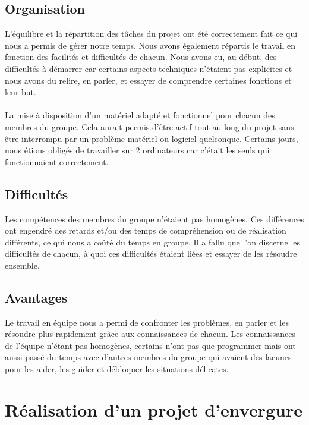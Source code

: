 \documentclass[12pt]{article}
\begin{document}
\subsection{Organisation}

	L'équilibre et la répartition des tâches du projet ont été correctement fait ce qui nous a permis de gérer notre temps. Nous avons également répartis le travail en fonction des facilités et difficultés de chacun. Nous avons eu, au début, des difficultés à démarrer car certains aspects techniques n'étaient pas explicites et nous avons du relire, en parler, et essayer de comprendre certaines fonctions et leur but.\\\\
	La mise à disposition d'un matériel adapté et fonctionnel pour chacun des membres du groupe. Cela aurait permis d'être actif tout au long du projet sans être interrompu par un problème matériel ou logiciel quelconque. Certains jours, nous étions obligés de travailler sur 2 ordinateurs car c'était les seuls qui fonctionnaient correctement.

\subsection{Difficultés}

Les compétences des membres du groupe n'étaient pas homogènes. Ces différences ont engendré des retards et/ou des temps de compréhension ou de réalisation différents, ce qui nous a coûté du temps en groupe. Il a fallu que l'on discerne les difficultés de chacun, à quoi ces difficultés étaient liées et essayer de les résoudre ensemble.

\subsection{Avantages}

Le travail en équipe nous a permi de confronter les problèmes, en parler et les résoudre plus rapidement grâce aux connaissances de chacun. Les connaissances de l'équipe n'étant pas homogènes, certains n'ont pas que programmer mais ont aussi passé du temps avec d'autres membres du groupe qui avaient des lacunes pour les aider, les guider et débloquer les situations délicates.

\newpage

\section{Réalisation d'un projet d'envergure}
\end{document}
